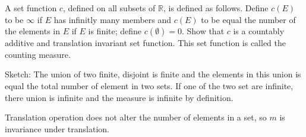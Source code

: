 \begin{exercise}{4}
    A set function $c$, defined on all subsets of $\mathbb R$, is defined as follows. Define $c(E)$ to be $\infty$ if $E$ has infinitly many members and $c(E)$ to be equal the number of the elements in $E$ if $E$ is finite; define $c(\emptyset) = 0$. Show that $c$ is a countably additive and translation invariant set function. This set function is called the counting measure.
\end{exercise}

\begin{solution}
    Sketch: 
    The union of two finite, disjoint is finite and the elements in this union is equal the total number of element in two sets.
    If one of the two set are infinite, there union is infinite and the measure is infinite by definition. 
    
    Translation operation does not alter the number of elements in a set, so $m$ is invariance under translation.
\end{solution}

